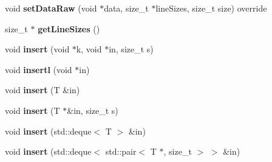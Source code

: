 \begin{DoxyCompactItemize}
\item 
\hypertarget{classfaster_1_1__workerFdd_3_01T_01_5_01_4_a4246404cbe09e51acf1f78af85e2ef13}{}void {\bfseries set\+Data\+Raw} (void $\ast$data, size\+\_\+t $\ast$line\+Sizes, size\+\_\+t size) override\label{classfaster_1_1__workerFdd_3_01T_01_5_01_4_a4246404cbe09e51acf1f78af85e2ef13}

\item 
\hypertarget{classfaster_1_1__workerFdd_3_01T_01_5_01_4_a18ba8f65a2811cb956b547ecb2982417}{}size\+\_\+t $\ast$ {\bfseries get\+Line\+Sizes} ()\label{classfaster_1_1__workerFdd_3_01T_01_5_01_4_a18ba8f65a2811cb956b547ecb2982417}

\item 
\hypertarget{classfaster_1_1__workerFdd_3_01T_01_5_01_4_ad0b49f344ef0a582f1cf01973832b570}{}void {\bfseries insert} (void $\ast$k, void $\ast$in, size\+\_\+t s)\label{classfaster_1_1__workerFdd_3_01T_01_5_01_4_ad0b49f344ef0a582f1cf01973832b570}

\item 
\hypertarget{classfaster_1_1__workerFdd_3_01T_01_5_01_4_aaa99e6a10c37391910d4aba2342ee618}{}void {\bfseries insertl} (void $\ast$in)\label{classfaster_1_1__workerFdd_3_01T_01_5_01_4_aaa99e6a10c37391910d4aba2342ee618}

\item 
\hypertarget{classfaster_1_1__workerFdd_3_01T_01_5_01_4_a43bf6522a9d2017c184e64f8be51698b}{}void {\bfseries insert} (T \&in)\label{classfaster_1_1__workerFdd_3_01T_01_5_01_4_a43bf6522a9d2017c184e64f8be51698b}

\item 
\hypertarget{classfaster_1_1__workerFdd_3_01T_01_5_01_4_ad3dabe7a5a99426a605e567cec8fe9d9}{}void {\bfseries insert} (T $\ast$\&in, size\+\_\+t s)\label{classfaster_1_1__workerFdd_3_01T_01_5_01_4_ad3dabe7a5a99426a605e567cec8fe9d9}

\item 
\hypertarget{classfaster_1_1__workerFdd_3_01T_01_5_01_4_a29976297df6221272c98ed2b83545775}{}void {\bfseries insert} (std\+::deque$<$ T $>$ \&in)\label{classfaster_1_1__workerFdd_3_01T_01_5_01_4_a29976297df6221272c98ed2b83545775}

\item 
\hypertarget{classfaster_1_1__workerFdd_3_01T_01_5_01_4_aa3fde5f3b38bb5e905f8d668526a0ede}{}void {\bfseries insert} (std\+::deque$<$ std\+::pair$<$ T $\ast$, size\+\_\+t $>$ $>$ \&in)\label{classfaster_1_1__workerFdd_3_01T_01_5_01_4_aa3fde5f3b38bb5e905f8d668526a0ede}


\end{DoxyCompactItemize}
